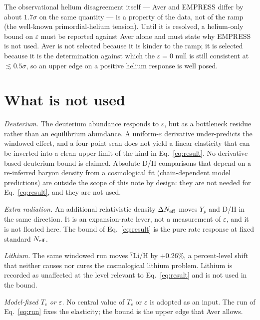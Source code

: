 \documentclass[aps,prd,twocolumn,superscriptaddress,nofootinbib,10pt]{revtex4-2}
\begin{document}
The observational helium disagreement itself --- Aver and EMPRESS differ by about $1.7\sigma$ on
the same quantity --- is a property of the data, not of the ramp (the well-known primordial-helium
tension). Until it is resolved, a helium-only bound on $\varepsilon$ must be reported against
Aver alone and must state why EMPRESS is not used. Aver is not selected because it is kinder to
the ramp; it is selected because it is the determination against which the $\varepsilon=0$ null
is still consistent at $\lesssim 0.5\sigma$, so an upper edge on a positive helium response is
well posed.

\section{What is not used}\label{sec:notused}

\emph{Deuterium.} The deuterium abundance responds to $\varepsilon$, but as a bottleneck residue
rather than an equilibrium abundance. A uniform-$\varepsilon$ derivative under-predicts the
windowed effect, and a four-point scan does not yield a linear elasticity that can be inverted
into a clean upper limit of the kind in Eq.~\eqref{eq:result}. No derivative-based deuterium bound
is claimed. Absolute D/H comparisons that depend on a re-inferred baryon density from a
cosmological fit (chain-dependent model predictions) are outside the scope of this note by
design: they are not needed for Eq.~\eqref{eq:result}, and they are not used.

\emph{Extra radiation.} An additional relativistic density $\Delta N_{\rm eff}$ moves $Y_p$ and
D/H in the same direction. It is an expansion-rate lever, not a measurement of $\varepsilon$, and
it is not floated here. The bound of Eq.~\eqref{eq:result} is the pure rate response at fixed
standard $N_{\rm eff}$.

\emph{Lithium.} The same windowed run moves $^7$Li/H by $+0.26\%$, a percent-level shift that
neither causes nor cures the cosmological lithium problem. Lithium is recorded as unaffected at
the level relevant to Eq.~\eqref{eq:result} and is not used in the bound.

\emph{Model-fixed $T_c$ or $\varepsilon$.} No central value of $T_c$ or $\varepsilon$ is adopted
as an input. The run of Eq.~\eqref{eq:run} fixes the elasticity; the bound is the upper edge that
Aver allows.

\end{document}
